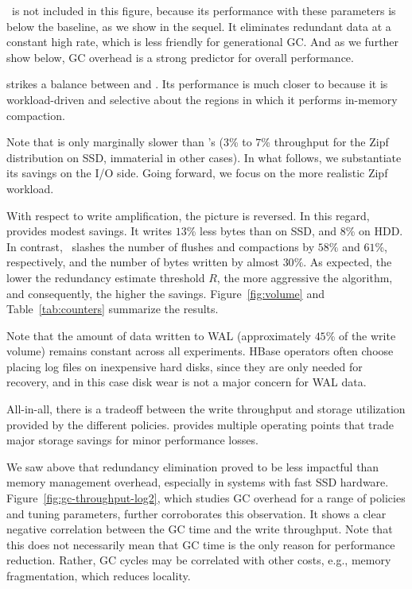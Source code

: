 \eager\ is not included in this figure, because its performance with these parameters is below the baseline, as we show in the sequel.
It eliminates redundant data at a constant high rate,
which is less friendly for generational GC. And as we further show below, GC overhead is a strong predictor for 
overall 
performance. 

\adp\/ strikes a balance between \basic\/ and \eager. Its performance is much closer to \basic\/ 
because it is workload-driven and selective about the regions in which it performs in-memory compaction.  



Note that \adp\/ is only marginally slower than \basic's ($3$\% to $7$\% throughput for the Zipf 
distribution on SSD, immaterial in other cases).  In what follows, we substantiate  its savings 
on the I/O side. Going forward, we focus on the more realistic Zipf workload.

With respect to write amplification, the picture is reversed. In this regard, 
\basic\/ provides modest savings. It writes $13$\% less bytes than \none\/ on SSD, and $8$\% 
on HDD. In contrast, \adp\ slashes the number of flushes and compactions by $58\%$ and $61$\%, 
respectively, and the number of bytes written by almost $30\%$. As expected, the lower the 
redundancy estimate threshold $R$, the more aggressive the algorithm, and consequently, 
the higher the savings. Figure~\ref{fig:volume} and Table~\ref{tab:counters} summarize the results. 

Note that the amount of data written to WAL %
(approximately $45$\% of the write volume) remains constant across all  experiments. 
HBase operators often choose placing log files on inexpensive hard disks, since they are only needed for recovery,
and in this case disk wear is not a major concern for WAL data.

All-in-all, there is a tradeoff between the write throughput and storage utilization 
provided by the different \sys\/ policies. \adp\/ provides multiple operating points that trade major 
storage savings for minor performance losses.

We saw above that 
redundancy elimination proved to be less impactful 
than memory management overhead, especially in systems with fast SSD hardware. 
Figure~\ref{fig:gc-throughput-log2}, which studies GC overhead for a range of policies and tuning 
parameters, further corroborates this observation. It shows a clear negative correlation between the 
GC time and the write throughput. 
Note that this does not necessarily mean that GC time is the only reason for performance reduction. Rather,
GC cycles may be correlated with other costs, e.g., memory fragmentation, which reduces locality.

